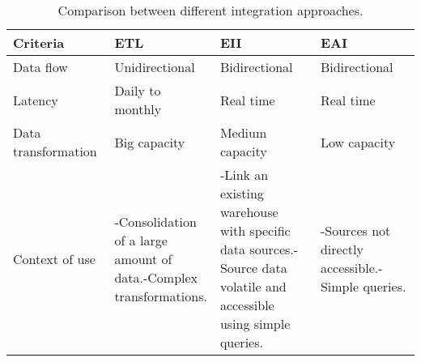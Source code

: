 \begin{table}[h!]
    \centering
    \begin{tabular}{|m{0.25\linewidth}||m{0.25\linewidth}|m{0.25\linewidth}|m{0.25\linewidth}|}
        \hline

        \textbf{Criteria}                             & \textbf{ETL}        & \textbf{EII}         & \textbf{EAI}                  \\

        \hline
        Data flow 	& Unidirectional	& Bidirectional		& Bidirectional     \\
        
        \hline
        Latency	    & Daily to monthly	& Real time	    & Real time       \\
        
        \hline
        Data transformation	    & Big capacity		& Medium capacity	& Low capacity        \\
        
        \hline
        Context of use	    & -Consolidation of a large amount of data.\newline -Complex transformations.	    & -Link an existing warehouse with specific data sources.\newline -Source data volatile and accessible using simple queries.    & -Sources not directly accessible.\newline -Simple queries.       \\
        
                
        \hline
    \end{tabular} 

    \caption{Comparison between different integration approaches.}
    \label{tab:approaches}
\end{table}